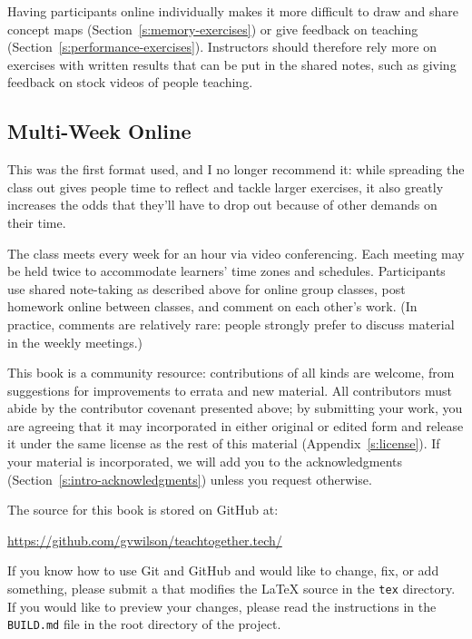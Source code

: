 Having participants online individually makes it more difficult to draw
and share concept maps (Section~\ref{s:memory-exercises}) or give
feedback on teaching (Section~\ref{s:performance-exercises}). Instructors
should therefore rely more on exercises with written results that can be
put in the shared notes, such as giving feedback on stock videos of
people teaching.

\subsection*{Multi-Week Online}

This was the first format used, and I no longer recommend it: while
spreading the class out gives people time to reflect and tackle larger
exercises, it also greatly increases the odds that they'll have to drop
out because of other demands on their time.

The class meets every week for an hour via video conferencing. Each
meeting may be held twice to accommodate learners' time zones and
schedules. Participants use shared note-taking as described above for
online group classes, post homework online between classes, and comment
on each other's work. (In practice, comments are relatively rare: people
strongly prefer to discuss material in the weekly meetings.)


This book is a community resource: contributions of all kinds are
welcome, from suggestions for improvements to errata and new material.
All contributors must abide by the contributor covenant presented above;
by submitting your work, you are agreeing that it may incorporated in
either original or edited form and release it under the same license as
the rest of this material (Appendix~\ref{s:license}). If your material is
incorporated, we will add you to the acknowledgments
(Section~\ref{s:intro-acknowledgments}) unless you request otherwise.

The source for this book is stored on GitHub at:

\begin{center}
  \url{https://github.com/gvwilson/teachtogether.tech/}
\end{center}

\noindent
If you know how to use Git and
GitHub and would like to change, fix, or add something, please
submit a  that modifies the LaTeX
source in the \texttt{tex} directory. If you would like to preview your
changes, please read the instructions in the \texttt{BUILD.md} file in the
root directory of the project.

